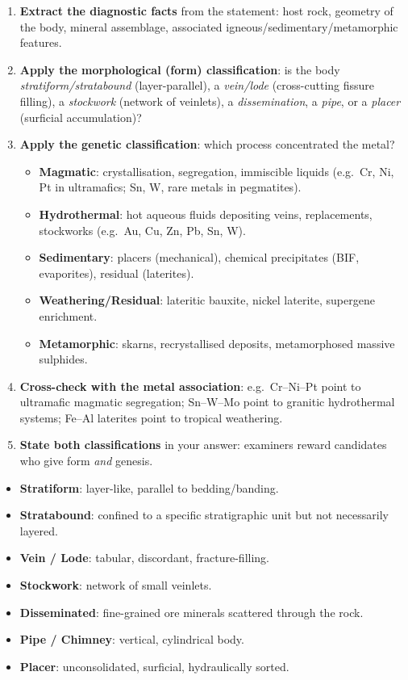 \documentclass[11pt]{article}
\begin{document}
\begin{methode}
\begin{enumerate}
\item \textbf{Extract the diagnostic facts} from the statement: host rock, geometry of the body, mineral assemblage, associated igneous/sedimentary/metamorphic features.
\item \textbf{Apply the morphological (form) classification}: is the body \emph{stratiform/stratabound} (layer-parallel), a \emph{vein/lode} (cross-cutting fissure filling), a \emph{stockwork} (network of veinlets), a \emph{dissemination}, a \emph{pipe}, or a \emph{placer} (surficial accumulation)?
\item \textbf{Apply the genetic classification}: which process concentrated the metal?
\begin{itemize}
\item \textbf{Magmatic}: crystallisation, segregation, immiscible liquids (e.g.\ Cr, Ni, Pt in ultramafics; Sn, W, rare metals in pegmatites).
\item \textbf{Hydrothermal}: hot aqueous fluids depositing veins, replacements, stockworks (e.g.\ Au, Cu, Zn, Pb, Sn, W).
\item \textbf{Sedimentary}: placers (mechanical), chemical precipitates (BIF, evaporites), residual (laterites).
\item \textbf{Weathering/Residual}: lateritic bauxite, nickel laterite, supergene enrichment.
\item \textbf{Metamorphic}: skarns, recrystallised deposits, metamorphosed massive sulphides.
\end{itemize}
\item \textbf{Cross-check with the metal association}: e.g.\ Cr--Ni--Pt point to ultramafic magmatic segregation; Sn--W--Mo point to granitic hydrothermal systems; Fe--Al laterites point to tropical weathering.
\item \textbf{State both classifications} in your answer: examiners reward candidates who give form \emph{and} genesis.
\end{enumerate}
\end{methode}

\begin{aretenir}
\begin{itemize}
\item \textbf{Stratiform}: layer-like, parallel to bedding/banding.
\item \textbf{Stratabound}: confined to a specific stratigraphic unit but not necessarily layered.
\item \textbf{Vein / Lode}: tabular, discordant, fracture-filling.
\item \textbf{Stockwork}: network of small veinlets.
\item \textbf{Disseminated}: fine-grained ore minerals scattered through the rock.
\item \textbf{Pipe / Chimney}: vertical, cylindrical body.
\item \textbf{Placer}: unconsolidated, surficial, hydraulically sorted.
\end{itemize}
\end{aretenir}
\end{document}
